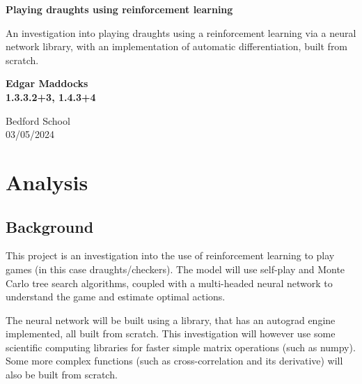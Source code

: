 \documentclass{article}
\begin{document}
\begin{titlepage}
    \begin{center}
        \vspace*{1cm}
            
        \Huge
        \textbf{Playing draughts using reinforcement learning}
            
        \vspace{0.5cm}
        \LARGE
        An investigation into playing draughts using a reinforcement learning via a neural network library, with an implementation of
        automatic differentiation, built from scratch.
            
        \vspace{1.5cm}
            
        \textbf{Edgar Maddocks}
        \\
        \textbf{1.3.3.2+3, 1.4.3+4}
            
        \vfill
            
        \vspace{0.8cm}
                        
        \Large
        Bedford School\\
        03/05/2024\\
            
    \end{center}
\end{titlepage}

    \pagebreak

    \tableofcontents

    \section{Analysis}
    \subsection{Background}
    This project is an investigation into the use of reinforcement learning to play games (in this case draughts/checkers).
    The model will use self-play and Monte Carlo tree search algorithms, coupled with a multi-headed neural network to
    understand the game and estimate optimal actions.

    The neural network will be built using a library, that has an autograd engine implemented, all built from scratch. This
    investigation will however use some scientific computing libraries for faster simple matrix operations (such as numpy). Some more
    complex functions (such as cross-correlation and its derivative) will also be built from scratch.
\end{document}
